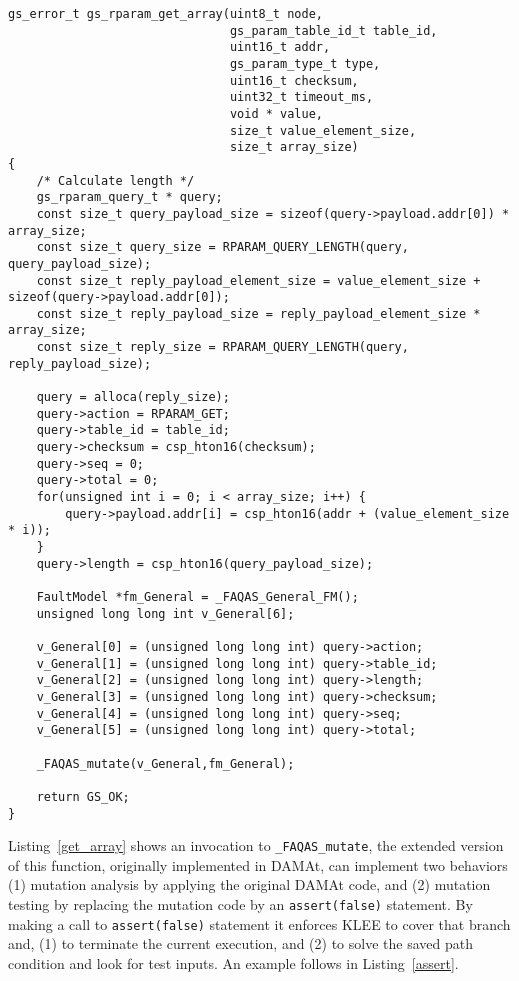 \begin{lstlisting}[style=CStyle,float=t, caption=Instrumented code for function gs\_rparam\_get\_array., label=get_array]
gs_error_t gs_rparam_get_array(uint8_t node,
                               gs_param_table_id_t table_id,
                               uint16_t addr,
                               gs_param_type_t type,
                               uint16_t checksum,
                               uint32_t timeout_ms,
                               void * value,
                               size_t value_element_size,
                               size_t array_size)
{
    /* Calculate length */
    gs_rparam_query_t * query;
    const size_t query_payload_size = sizeof(query->payload.addr[0]) * array_size;
    const size_t query_size = RPARAM_QUERY_LENGTH(query, query_payload_size);
    const size_t reply_payload_element_size = value_element_size + sizeof(query->payload.addr[0]);
    const size_t reply_payload_size = reply_payload_element_size * array_size;
    const size_t reply_size = RPARAM_QUERY_LENGTH(query, reply_payload_size);

    query = alloca(reply_size);
    query->action = RPARAM_GET;
    query->table_id = table_id;
    query->checksum = csp_hton16(checksum);
    query->seq = 0;
    query->total = 0;
    for(unsigned int i = 0; i < array_size; i++) {
        query->payload.addr[i] = csp_hton16(addr + (value_element_size * i));
    }
    query->length = csp_hton16(query_payload_size);

    FaultModel *fm_General = _FAQAS_General_FM();
    unsigned long long int v_General[6];

    v_General[0] = (unsigned long long int) query->action;
    v_General[1] = (unsigned long long int) query->table_id;
    v_General[2] = (unsigned long long int) query->length;
    v_General[3] = (unsigned long long int) query->checksum;
    v_General[4] = (unsigned long long int) query->seq;
    v_General[5] = (unsigned long long int) query->total;

    _FAQAS_mutate(v_General,fm_General);

    return GS_OK;
}
\end{lstlisting}

Listing~\ref{get_array} shows an invocation to \texttt{\_FAQAS\_mutate}, the extended version of this function, originally implemented in DAMAt, can implement two behaviors (1) mutation analysis by applying the original DAMAt code, and (2) mutation testing by replacing the mutation code by an \texttt{assert(false)} statement. 
By making a call to \texttt{assert(false)} statement it enforces KLEE to cover that branch and, (1) to terminate the current execution, and (2) to solve the saved path condition and look for test inputs. An example follows in Listing~\ref{assert}.

